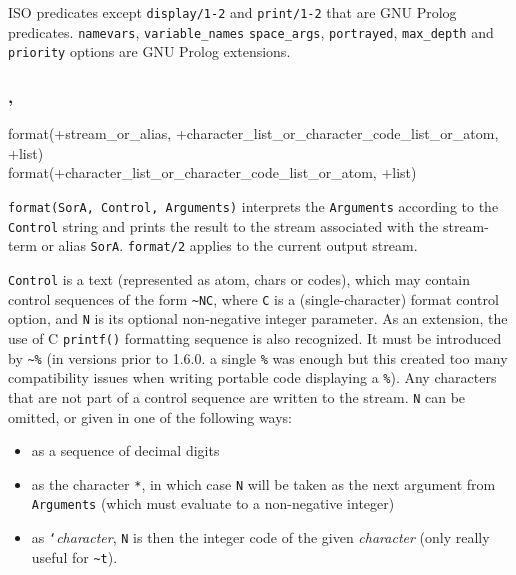 \Portability

ISO predicates except \texttt{display/1-2} and \texttt{print/1-2} that
are GNU Prolog predicates. \texttt{namevars}, \texttt{variable\_names} \texttt{space\_args},
\texttt{portrayed}, \texttt{max\_depth} and \texttt{priority}
options are GNU Prolog extensions.

\subsubsection{,\label{format/3}
               }


\begin{TemplatesOneCol}
format(+stream\_or\_alias, +character\_list\_or\_character\_code\_list\_or\_atom,
+list)\\
format(+character\_list\_or\_character\_code\_list\_or\_atom, +list)

\end{TemplatesOneCol}

\Description

\texttt{format(SorA, Control, Arguments)} interprets the \texttt{Arguments}
according to the \texttt{Control} string and prints the result to the stream
associated with the stream-term or alias \texttt{SorA}.
\texttt{format/2} applies to the current output stream.

\texttt{Control} is a text (represented as atom, chars or codes), which may
contain control sequences of the form \texttt{\~{}NC}, where \texttt{C} is a
(single-character) format control option, and \texttt{N} is its optional
non-negative integer parameter. As an extension, the use of C \texttt{printf()}
formatting sequence is also recognized. It must be introduced by \texttt{\~{}\%}
(in versions prior to 1.6.0. a single \texttt{\%} was enough but this created
too many compatibility issues when writing portable code displaying a
\texttt{\%}). Any characters that are not part of a control sequence are written to the
stream. \texttt{N} can be omitted, or given in one of the following ways:

\begin{itemize}
\item as a sequence of decimal digits
\item as the character \texttt{*}, in which case \texttt{N} will be taken as the
  next argument from \texttt{Arguments} (which must evaluate to a non-negative integer)
\item as \texttt{`}\textit{character}, \texttt{N} is then the integer code of the given
  \textit{character} (only really useful for \texttt{\~{}t}).
\end{itemize}

